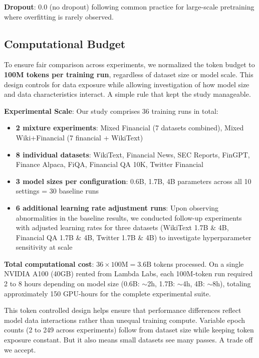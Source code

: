 \textbf{Dropout}: 0.0 (no dropout) following common practice for large-scale pretraining where overfitting is rarely observed.

\subsection{Computational Budget}

To ensure fair comparison across experiments, we normalized the token budget to \textbf{100M tokens per training run}, regardless of dataset size or model scale. This design controls for data exposure while allowing investigation of how model size and data characteristics interact. A simple rule that kept the study manageable.

\textbf{Experimental Scale}: Our study comprises 36 training runs in total:
\begin{itemize}
    \item \textbf{2 mixture experiments}: Mixed Financial (7 datasets combined), Mixed Wiki+Financial (7 financial + WikiText)
    \item \textbf{8 individual datasets}: WikiText, Financial News, SEC Reports, FinGPT, Finance Alpaca, FiQA, Financial QA 10K, Twitter Financial
    \item \textbf{3 model sizes per configuration}: 0.6B, 1.7B, 4B parameters across all 10 settings = 30 baseline runs
    \item \textbf{6 additional learning rate adjustment runs}: Upon observing abnormalities in the baseline results, we conducted follow-up experiments with adjusted learning rates for three datasets (WikiText 1.7B \& 4B, Financial QA 1.7B \& 4B, Twitter 1.7B \& 4B) to investigate hyperparameter sensitivity at scale
\end{itemize}

\textbf{Total computational cost}: $36 \times 100\text{M} = 3.6\text{B}$ tokens processed. On a single NVIDIA A100 (40GB) rented from Lambda Labs, each 100M-token run required 2 to 8 hours depending on model size (0.6B: $\sim$2h, 1.7B: $\sim$4h, 4B: $\sim$8h), totaling approximately 150 GPU-hours for the complete experimental suite.

This token controlled design helps ensure that performance differences reflect model data interactions rather than unequal training compute. Variable epoch counts (2 to 249 across experiments) follow from dataset size while keeping token exposure constant. But it also means small datasets see many passes. A trade off we accept.

